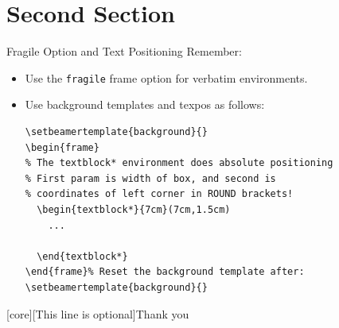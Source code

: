 \documentclass{slides} %
\begin{document}
\section{Second Section}

\begin{frame}[fragile]{Fragile Option and Text Positioning}
  Remember:
  \begin{itemize}[<+->]
    \item Use the \texttt{fragile} frame option for \textcolor<2->{OUMidBlue}{verbatim} environments.
    \item Use \colorbox{OUYellow}{background templates} and \alert{texpos} as follows:
          \begin{verbatim}
\setbeamertemplate{background}{}
\begin{frame}
% The textblock* environment does absolute positioning
% First param is width of box, and second is
% coordinates of left corner in ROUND brackets!
  \begin{textblock*}{7cm}(7cm,1.5cm)
    ...
    
  \end{textblock*}
\end{frame}% Reset the background template after:
\setbeamertemplate{background}{}
\end{verbatim}
  \end{itemize}
\end{frame}

[core][This line is optional]{Thank you}
\begin{frame}
\end{frame}
\end{document}
